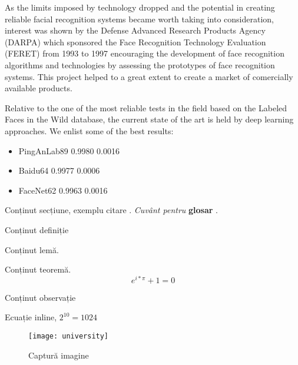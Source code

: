 As the limits imposed by technology dropped and the potential in creating reliable facial recognition systems became worth taking into consideration, interest was shown by the Defense Advanced Research Products Agency (DARPA) which sponsored the Face Recognition Technology Evaluation (FERET) \cite{Phillips:2000:FEM:354167.354178} from 1993 to 1997 encouraging the development of face recognition algorithms and technologies by assessing the prototypes of face recognition systems. This project helped to a great extent to create a market of comercially available products.





Relative to the one of the most reliable tests in the field based on the Labeled Faces in the Wild database, the current state of the art is held by deep learning approaches. We enlist some of the best results:
\begin{itemize}
	\item PingAnLab89 0.9980 0.0016
	\item Baidu64 0.9977 0.0006
	\item FaceNet62 0.9963 0.0016
\end{itemize}



Conținut secțiune, exemplu citare \cite{hoare_csp}.
\textit{Cuvânt pentru} \textbf{glosar} .	

\begin{definition}
	Conținut definiție
\end{definition}

\begin{lemma}
	Conținut lemă.
\end{lemma}

\begin{theorem}
	Conținut teoremă.
	\[
		e^{i * \pi} + 1 = 0
	\]
\end{theorem}

\begin{remark}
	Conținut observație
\end{remark}

Ecuație inline, $2^{10} = 1024 $

\begin{figure}[h]
	\begin{center}
			\texttt{[image: university]}
	\end{center}
	\caption{Captură imagine}
\end{figure}